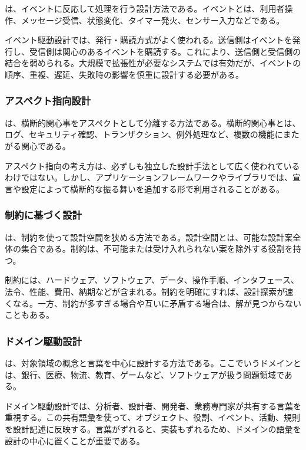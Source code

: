  は、イベントに反応して処理を行う設計方法である。イベントとは、利用者操作、メッセージ受信、状態変化、タイマー発火、センサー入力などである。

イベント駆動設計では、発行・購読方式がよく使われる。送信側はイベントを発行し、受信側は関心のあるイベントを購読する。これにより、送信側と受信側の結合を弱められる。大規模で拡張性が必要なシステムでは有効だが、イベントの順序、重複、遅延、失敗時の影響を慎重に設計する必要がある。

\subsubsection{アスペクト指向設計}

 は、横断的関心事をアスペクトとして分離する方法である。横断的関心事とは、ログ、セキュリティ確認、トランザクション、例外処理など、複数の機能にまたがる関心である。

アスペクト指向の考え方は、必ずしも独立した設計手法として広く使われているわけではない。しかし、アプリケーションフレームワークやライブラリでは、宣言や設定によって横断的な振る舞いを追加する形で利用されることがある。

\subsubsection{制約に基づく設計}

 は、制約を使って設計空間を狭める方法である。設計空間とは、可能な設計案全体の集合である。制約は、不可能または受け入れられない案を除外する役割を持つ。

制約には、ハードウェア、ソフトウェア、データ、操作手順、インタフェース、法令、性能、費用、納期などが含まれる。制約を明確にすれば、設計探索が速くなる。一方、制約が多すぎる場合や互いに矛盾する場合は、解が見つからないこともある。

\subsubsection{ドメイン駆動設計}

 は、対象領域の概念と言葉を中心に設計する方法である。ここでいうドメインとは、銀行、医療、物流、教育、ゲームなど、ソフトウェアが扱う問題領域である。

ドメイン駆動設計では、分析者、設計者、開発者、業務専門家が共有する言葉を重視する。この共有語彙を使って、オブジェクト、役割、イベント、活動、規則を設計記述に反映する。言葉がずれると、実装もずれるため、ドメインの語彙を設計の中心に置くことが重要である。

